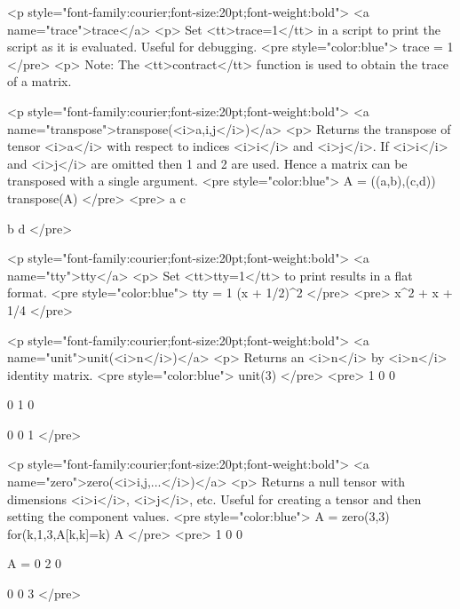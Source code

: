 <p style="font-family:courier;font-size:20pt;font-weight:bold">
<a name="trace">trace</a>
<p>
Set <tt>trace=1</tt> in a script to print the script as it is evaluated.
Useful for debugging.
<pre style="color:blue">
trace = 1
</pre>
<p>
Note: The <tt>contract</tt> function is used to obtain the trace of a matrix.

<p style="font-family:courier;font-size:20pt;font-weight:bold">
<a name="transpose">transpose(<i>a,i,j</i>)</a>
<p>
Returns the transpose of tensor <i>a</i> with respect to indices <i>i</i> and <i>j</i>.
If <i>i</i> and <i>j</i> are omitted then 1 and 2 are used.
Hence a matrix can be transposed with a single argument.
<pre style="color:blue">
A = ((a,b),(c,d))
transpose(A)
</pre>
<pre>
a   c

b   d
</pre>

<p style="font-family:courier;font-size:20pt;font-weight:bold">
<a name="tty">tty</a>
<p>
Set <tt>tty=1</tt> to print results in a flat format.
<pre style="color:blue">
tty = 1
(x + 1/2)^2
</pre>
<pre>
x^2 + x + 1/4
</pre>

<p style="font-family:courier;font-size:20pt;font-weight:bold">
<a name="unit">unit(<i>n</i>)</a>
<p>
Returns an <i>n</i> by <i>n</i> identity matrix.
<pre style="color:blue">
unit(3)
</pre>
<pre>
1   0   0

0   1   0

0   0   1
</pre>

<p style="font-family:courier;font-size:20pt;font-weight:bold">
<a name="zero">zero(<i>i,j,...</i>)</a>
<p>
Returns a null tensor with dimensions <i>i</i>, <i>j</i>, etc.
Useful for creating a tensor and then setting the component values.
<pre style="color:blue">
A = zero(3,3)
for(k,1,3,A[k,k]=k)
A
</pre>
<pre>
    1   0   0

A = 0   2   0

    0   0   3
</pre>

\fi
